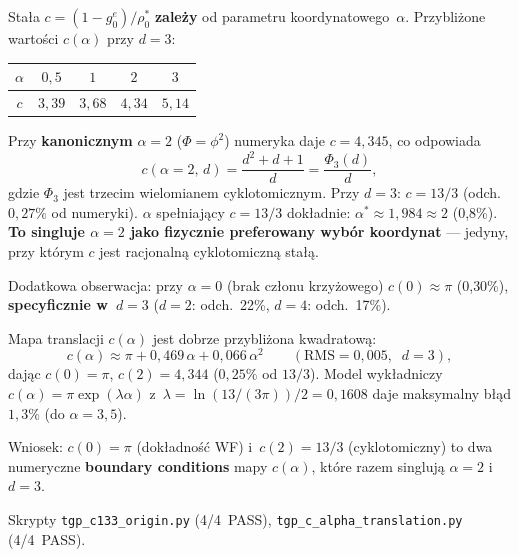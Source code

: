 \begin{proposition}[Struktura sta\l{}ej ERG: $c(\alpha)$ i~wybr\'or $\alpha{=}2$]
\label{prop:Z-c-alpha-structure}
Sta\l{}a $c = (1{-}g_0^e)/\rho_0^*$ \textbf{zale\.zy} od parametru koordynatowego~$\alpha$.
Przybli\.zone warto\'sci $c(\alpha)$ przy $d=3$:
\begin{center}\footnotesize
\begin{tabular}{ccccc}
\toprule
$\alpha$ & $0{,}5$ & $1$ & $2$ & $3$ \\
\midrule
$c$ & $3{,}39$ & $3{,}68$ & $4{,}34$ & $5{,}14$ \\
\bottomrule
\end{tabular}
\end{center}
Przy \textbf{kanonicznym} $\alpha = 2$ ($\Phi = \phi^2$)
numeryka daje $c = 4{,}345$, co odpowiada
\begin{equation}\label{eq:c-cyclotomic}
  c(\alpha{=}2,\, d) = \frac{d^2 + d + 1}{d}
    = \frac{\Phi_3(d)}{d},
\end{equation}
gdzie $\Phi_3$ jest trzecim wielomianem cyklotomicznym.
Przy $d = 3$: $c = 13/3$ (odch.\ $0{,}27\%$ od numeryki).
$\alpha$ spe\l{}niaj\k{a}cy $c = 13/3$ dok\l{}adnie:
$\alpha^* \approx 1{,}984 \approx 2$ (0{,}8\%).
\textbf{To singluje $\alpha = 2$ jako fizycznie preferowany
wyb\'or koordynat} --- jedyny, przy kt\'orym
$c$ jest racjonaln\k{a} cyklotomiczn\k{a} sta\l{}\k{a}.

Dodatkowa obserwacja: przy $\alpha = 0$ (brak cz\l{}onu krzy\.zowego)
$c(0) \approx \pi$ (0{,}30\%), \textbf{specyficznie w~$d = 3$}
($d=2$: odch.~22\%, $d=4$: odch.~17\%).

Mapa translacji $c(\alpha)$ jest dobrze przybli\.zona kwadratow\k{a}:
\begin{equation}\label{eq:c-alpha-quadratic}
  c(\alpha) \approx \pi + 0{,}469\,\alpha + 0{,}066\,\alpha^2
  \qquad (\text{RMS} = 0{,}005,\;\; d=3),
\end{equation}
daj\k{a}c $c(0) = \pi$, $c(2) = 4{,}344$ ($0{,}25\%$ od $13/3$).
Model wyk\l{}adniczy $c(\alpha) = \pi \exp(\lambda\alpha)$
z~$\lambda = \ln(13/(3\pi))/2 = 0{,}1608$ daje
maksymalny b\l{}\k{a}d $1{,}3\%$ (do $\alpha = 3{,}5$).

Wniosek: $c(0) = \pi$ (dok\l{}adno\'s\'c WF)
i~$c(2) = 13/3$ (cyklotomiczny) to dwa numeryczne
\textbf{boundary conditions} mapy $c(\alpha)$,
kt\'ore razem singluj\k{a} $\alpha = 2$ i~$d = 3$.

Skrypty \texttt{tgp\_c133\_origin.py} (4/4~PASS),
\texttt{tgp\_c\_alpha\_translation.py} (4/4~PASS).
\end{proposition}


